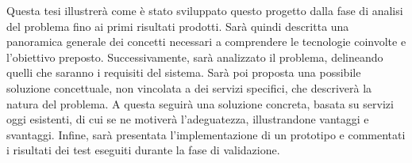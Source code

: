 Questa tesi illustrerà come è stato sviluppato questo progetto dalla fase di
analisi del problema fino ai primi risultati prodotti. Sarà quindi descritta
una panoramica generale dei concetti necessari a comprendere le tecnologie
coinvolte e l’obiettivo preposto. Successivamente, sarà analizzato il problema,
delineando quelli che saranno i requisiti del sistema. Sarà poi proposta una
possibile soluzione concettuale, non vincolata a dei servizi specifici, che
descriverà la natura del problema. A questa seguirà una soluzione concreta,
basata su servizi oggi esistenti, di cui se ne motiverà l’adeguatezza,
illustrandone vantaggi e svantaggi. Infine, sarà presentata l'implementazione
di un prototipo e commentati i risultati dei test eseguiti durante la fase di
validazione.

